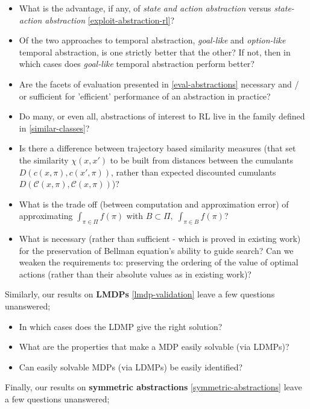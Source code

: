 \begin{itemize}
	\tightlist
	\item What is the advantage, if any, of \textit{state and action abstraction} versus \textit{state-action abstraction} \ref{exploit-abstraction-rl}?
	\item Of the two approaches to temporal abstraction, \textit{goal-like} and \textit{option-like} temporal abstraction, is one strictly better that the other? If not, then in which cases does \textit{goal-like} temporal abstraction perform better?
	\item Are the facets of evaluation presented in \ref{eval-abstractions} necessary and / or sufficient for 'efficient' performance of an abstraction in practice?
	\item Do many, or even all, abstractions of interest to RL live in the family defined in \ref{similar-classes}?
	\item Is there a difference between trajectory based similarity measures (that set the similarity $\chi(x, x')$ to be built from distances between the cumulants $D(c(x, \pi), c(x', \pi))$, rather than expected discounted cumulants $D(\mathcal C(x, \pi), \mathcal C(x, \pi))$)?
	\item What is the trade off (between computation and approximation error) of approximating $\int_{\pi \in \Pi}f(\pi)$ with $B \subset \Pi, \; \int_{\pi \in B}f(\pi)$?
	\item What is necessary (rather than sufficient - which is proved in existing work) for the preservation of Bellman equation's ability to guide search? Can we weaken the requirements to: preserving the ordering of the value of optimal actions (rather than their absolute values as in existing work)?
\end{itemize}

Similarly, our results on \textbf{LMDPs} \ref{lmdp-validation} leave a few questions unanswered;

\begin{itemize}
	\tightlist
	\item In which cases does the LDMP give the right solution?
	\item What are the properties that make a MDP easily solvable (via LDMPs)?
	\item Can easily solvable MDPs (via LDMPs) be easily identified?
\end{itemize}

Finally, our results on \textbf{symmetric abstractions} \ref{symmetric-abstractions} leave a few questions unanswered;

